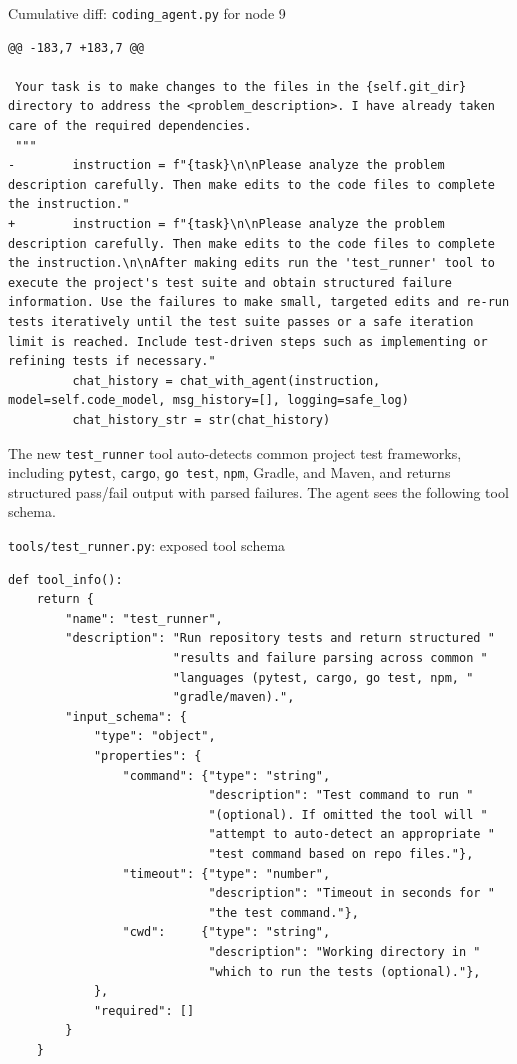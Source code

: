\documentclass{article}
\begin{document}
\begin{codebox}{Cumulative diff: \texttt{coding\_agent.py} for node 9}
\begin{lstlisting}[style=diffstyle]
@@ -183,7 +183,7 @@

 Your task is to make changes to the files in the {self.git_dir} directory to address the <problem_description>. I have already taken care of the required dependencies.
 """
-        instruction = f"{task}\n\nPlease analyze the problem description carefully. Then make edits to the code files to complete the instruction."
+        instruction = f"{task}\n\nPlease analyze the problem description carefully. Then make edits to the code files to complete the instruction.\n\nAfter making edits run the 'test_runner' tool to execute the project's test suite and obtain structured failure information. Use the failures to make small, targeted edits and re-run tests iteratively until the test suite passes or a safe iteration limit is reached. Include test-driven steps such as implementing or refining tests if necessary."
         chat_history = chat_with_agent(instruction, model=self.code_model, msg_history=[], logging=safe_log)
         chat_history_str = str(chat_history)
\end{lstlisting}
\end{codebox}

The new \texttt{test\_runner} tool auto-detects common project test frameworks, including \texttt{pytest}, \texttt{cargo}, \texttt{go test}, \texttt{npm}, Gradle, and Maven, and returns structured pass/fail output with parsed failures. The agent sees the following tool schema.

\begin{codebox}{\texttt{tools/test\_runner.py}: exposed tool schema}
\begin{lstlisting}[style=pystyle]
def tool_info():
    return {
        "name": "test_runner",
        "description": "Run repository tests and return structured "
                       "results and failure parsing across common "
                       "languages (pytest, cargo, go test, npm, "
                       "gradle/maven).",
        "input_schema": {
            "type": "object",
            "properties": {
                "command": {"type": "string",
                            "description": "Test command to run "
                            "(optional). If omitted the tool will "
                            "attempt to auto-detect an appropriate "
                            "test command based on repo files."},
                "timeout": {"type": "number",
                            "description": "Timeout in seconds for "
                            "the test command."},
                "cwd":     {"type": "string",
                            "description": "Working directory in "
                            "which to run the tests (optional)."},
            },
            "required": []
        }
    }
\end{lstlisting}
\end{codebox}
\end{document}
